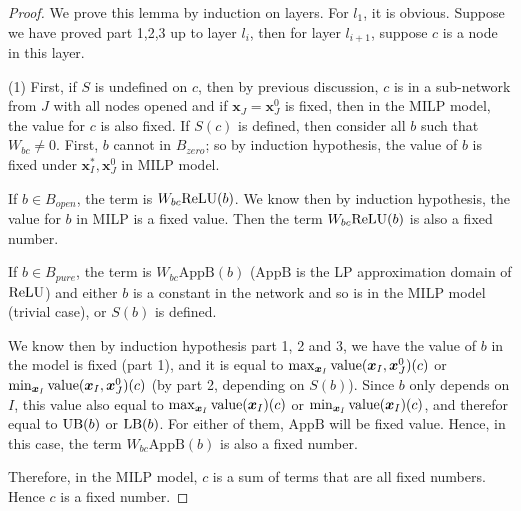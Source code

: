 				\begin{proof}
					We prove this lemma by induction on layers. For $l_1$, it is obvious. Suppose we have proved part 1,2,3 up to layer $l_i$, then for layer $l_{i+1}$, suppose $c$ is a node in this layer. 
					
					(1)	First, if $S$ is undefined on $c$, then by previous discussion, $c$ is in a sub-network from $J$ with all nodes opened and if $\boldsymbol{x}_J=\boldsymbol{x}_J^0$ is fixed, then in the MILP model, the value for $c$ is also fixed. If $S(c)$ is defined, then consider all $b$ such that $W_{bc}\neq 0$. First, $b$ cannot in $B_{zero}$; so by induction hypothesis, the value of $b$ is fixed under $\boldsymbol{x}^*_I,\boldsymbol{x}^0_J$ in MILP model. 
					
					
					
					If $b\in B_{open}$, the term is $W_{bc}\mathrm{ReLU}(b)$. We know then by induction hypothesis, the value for $b$ in MILP is a fixed value. Then the term $W_{bc}\mathrm{ReLU}(b)$ is also a fixed number.  
					
					If $b\in B_{pure}$, the term is $W_{bc}\mathrm{AppB}(b)$ ($\mathrm{AppB}$ is the LP approximation domain of $\mathrm{ReLU}$) and either $b$ is a constant in the network and so is in the MILP model (trivial case), or $S(b)$ is defined. 
					
					We know then by induction hypothesis part 1, 2 and 3,  we have the value of $b$ in the model is fixed (part 1), and it is equal to $\max_{\boldsymbol{x}_I} {\textrm{value}}(\boldsymbol{x}_I,\boldsymbol{x}^0_J)(c)$ or $\min_{\boldsymbol{x}_I} {\textrm{value}}(\boldsymbol{x}_I,\boldsymbol{x}^0_J)(c)$ (by part 2, depending on $S(b)$). Since $b$ only depends on $I$, this value also equal to $\max_{\boldsymbol{x}_I} {\textrm{value}}(\boldsymbol{x}_I)(c)$ or $\min_{\boldsymbol{x}_I} {\textrm{value}}(\boldsymbol{x}_I)(c)$, and therefor equal to $\mathrm{UB}(b)$ or $\mathrm{LB}(b)$. For either of them, $\mathrm{AppB}$ will be fixed value. Hence, in this case, the term $W_{bc}\mathrm{AppB}(b)$ is also a fixed number.
					
					Therefore, in the MILP model, $c$ is a sum of terms that are all fixed numbers. Hence $c$ is a fixed number.
					

\end{proof}
